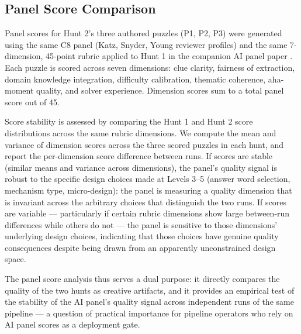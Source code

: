 \subsection{Panel Score Comparison}
\label{sec:panel-comparison}

Panel scores for Hunt 2's three authored puzzles (P1, P2, P3) were generated using the same C8 panel (Katz, Snyder, Young reviewer profiles) and the same 7-dimension, 45-point rubric applied to Hunt 1 in the companion AI panel paper \cite{paper3}. Each puzzle is scored across seven dimensions: clue clarity, fairness of extraction, domain knowledge integration, difficulty calibration, thematic coherence, aha-moment quality, and solver experience. Dimension scores sum to a total panel score out of 45.

Score stability is assessed by comparing the Hunt 1 and Hunt 2 score distributions across the same rubric dimensions. We compute the mean and variance of dimension scores across the three scored puzzles in each hunt, and report the per-dimension score difference between runs. If scores are stable (similar means and variance across dimensions), the panel's quality signal is robust to the specific design choices made at Levels 3--5 (answer word selection, mechanism type, micro-design): the panel is measuring a quality dimension that is invariant across the arbitrary choices that distinguish the two runs. If scores are variable --- particularly if certain rubric dimensions show large between-run differences while others do not --- the panel is sensitive to those dimensions' underlying design choices, indicating that those choices have genuine quality consequences despite being drawn from an apparently unconstrained design space.

The panel score analysis thus serves a dual purpose: it directly compares the quality of the two hunts as creative artifacts, and it provides an empirical test of the stability of the AI panel's quality signal across independent runs of the same pipeline --- a question of practical importance for pipeline operators who rely on AI panel scores as a deployment gate.

\label{sec:methodology-end}
